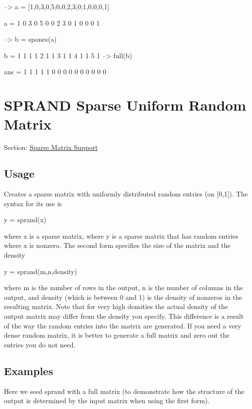 \begin{DoxyVerbInclude}
--> a = [1,0,3,0,5;0,0,2,3,0;1,0,0,0,1]

a = 
 1 0 3 0 5 
 0 0 2 3 0 
 1 0 0 0 1 

--> b = spones(a)

b = 
 1 1 1
 1 2 1
 1 3 1
 1 4 1
 1 5 1
--> full(b)

ans = 
 1 1 1 1 1 
 0 0 0 0 0 
 0 0 0 0 0 
\end{DoxyVerbInclude}
 \hypertarget{sparse_sprand}{}\section{S\-P\-R\-A\-N\-D Sparse Uniform Random Matrix}\label{sparse_sprand}
Section\-: \hyperlink{sec_sparse}{Sparse Matrix Support} \hypertarget{vtkwidgets_vtkxyplotwidget_Usage}{}\subsection{Usage}\label{vtkwidgets_vtkxyplotwidget_Usage}
Creates a sparse matrix with uniformly distributed random entries (on \mbox{[}0,1\mbox{]}). The syntax for its use is \begin{DoxyVerb}  y = sprand(x)
\end{DoxyVerb}
 where {\ttfamily x} is a sparse matrix, where {\ttfamily y} is a sparse matrix that has random entries where {\ttfamily x} is nonzero. The second form specifies the size of the matrix and the density \begin{DoxyVerb}  y = sprand(m,n,density)
\end{DoxyVerb}
 where {\ttfamily m} is the number of rows in the output, {\ttfamily n} is the number of columns in the output, and {\ttfamily density} (which is between 0 and 1) is the density of nonzeros in the resulting matrix. Note that for very high densities the actual density of the output matrix may differ from the density you specify. This difference is a result of the way the random entries into the matrix are generated. If you need a very dense random matrix, it is better to generate a full matrix and zero out the entries you do not need. \hypertarget{variables_matrix_Examples}{}\subsection{Examples}\label{variables_matrix_Examples}
Here we seed {\ttfamily sprand} with a full matrix (to demonstrate how the structure of the output is determined by the input matrix when using the first form).


